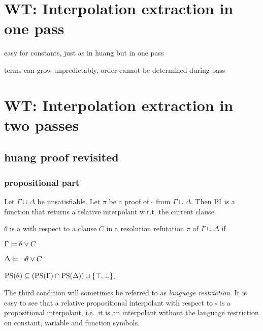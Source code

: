 
\section{WT: Interpolation extraction in one pass}

easy for constants, just as in huang but in one pass

terms can grow unpredictably, order cannot be determined during pass

\section{WT: Interpolation extraction in two passes}

\subsection{huang proof revisited}

\subsubsection{propositional part}

Let $\Gamma \cup \Delta$ be unsatisfiable. Let $\pi$ be a proof of $\square$ from $\Gamma \cup \Delta$. Then $\mathrm{PI}$ is a function that returns a relative interpolant w.r.t. the current clause. 

\begin{defi}
	$\theta$ is a  with respect to a clause $C$ in a resolution refutation $\pi$ of $\Gamma \cup \Delta$ if 
	\label{def:rel_prop_interpol}
	\begin{compactenum}
		\item $\Gamma \models \theta \lor C$
			\label{rel_prop_interpol_cond1}
		\item $\Delta \models \lnot \theta \lor C$
			\label{rel_prop_interpol_cond2}
		\item $\mathrm{PS}(\theta) \subseteq (\mathrm{PS}(\Gamma) \cap \mathrm{PS}(\Delta)) \cup \{\top, \bot\} $.
			\label{rel_prop_interpol_cond_lang}
			\qedhere
	\end{compactenum}
\end{defi}

The third condition will sometimes be referred to as \emph{language restriction}.
It is easy to see that a relative propositional interpolant with respect to $\square$ is a propositional interpolant, i.e.~it is an interpolant without the language restriction on constant, variable and function symbols.

